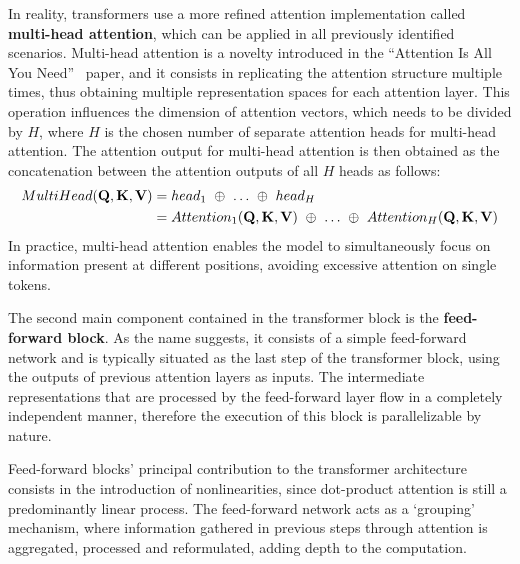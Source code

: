 In reality, transformers use a more refined attention implementation called \textbf{multi-head attention}, which can be applied in all previously identified scenarios.
Multi-head attention is a novelty introduced in the ``Attention Is All You Need''~\cite{vaswani2017} paper, and it consists in replicating the attention structure multiple times, thus obtaining multiple representation spaces for each attention layer.
This operation influences the dimension of attention vectors, which needs to be divided by $H$, where $H$ is the chosen number of separate attention heads for multi-head attention.
The attention output for multi-head attention is then obtained as the concatenation between the attention outputs of all $H$ heads as follows:
\begin{equation}
    \label{eq:background_multihead-attention}
    \begin{aligned}
    MultiHead(\gbm{Q},\gbm{K},\gbm{V})    &= head_1\ \oplus\ \ldots\ \oplus\ head_H \\
                        &= Attention_1(\gbm{Q},\gbm{K},\gbm{V})\ \oplus\ \ldots\ \oplus\ Attention_H(\gbm{Q},\gbm{K},\gbm{V})
    \end{aligned}
\end{equation}
In practice, multi-head attention enables the model to simultaneously focus on information present at different positions, avoiding excessive attention on single tokens.


The second main component contained in the transformer block is the \textbf{feed-forward block}.
As the name suggests, it consists of a simple feed-forward network and is typically situated as the last step of the transformer block, using the outputs of previous attention layers as inputs.
The intermediate representations that are processed by the feed-forward layer flow in a completely independent manner, therefore the execution of this block is parallelizable by nature.

Feed-forward blocks' principal contribution to the transformer architecture consists in the introduction of nonlinearities, since dot-product attention is still a predominantly linear process.
The feed-forward network acts as a `grouping' mechanism, where information gathered in previous steps through attention is aggregated, processed and reformulated, adding depth to the computation.

